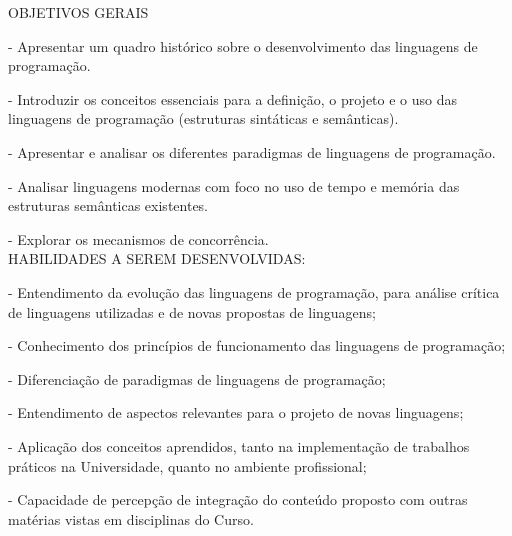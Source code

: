 \small
OBJETIVOS GERAIS

- Apresentar um quadro histórico sobre o desenvolvimento das linguagens de programação. 

- Introduzir os conceitos essenciais para a definição, o projeto e o uso das linguagens de programação (estruturas 
sintáticas e semânticas). 

- Apresentar e analisar os diferentes paradigmas de linguagens de programação. 

- Analisar linguagens modernas com foco no uso de tempo e memória das estruturas semânticas existentes. 

- Explorar os mecanismos de concorrência. \\


HABILIDADES A SEREM DESENVOLVIDAS:

- Entendimento da evolução das linguagens de programação, para análise crítica de linguagens utilizadas e de novas 
propostas de linguagens;

- Conhecimento dos princípios de funcionamento das linguagens de programação; 

- Diferenciação de paradigmas de linguagens de programação;

- Entendimento de aspectos relevantes para o projeto de novas linguagens;

- Aplicação dos conceitos aprendidos, tanto na implementação de trabalhos práticos na Universidade, quanto no ambiente 
profissional;

- Capacidade de percepção de integração do conteúdo proposto com outras matérias vistas em disciplinas do Curso.